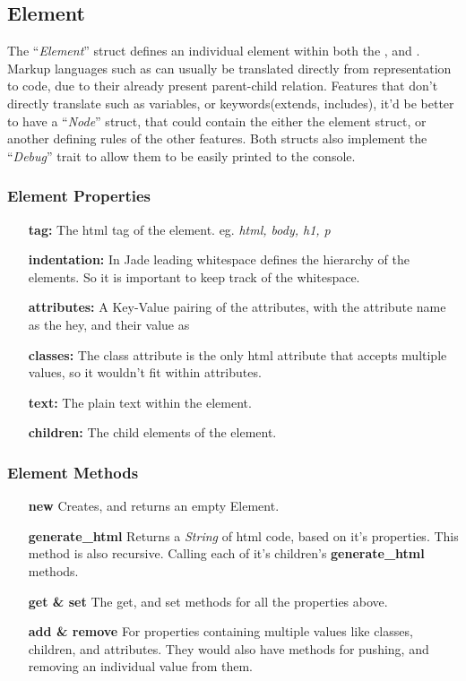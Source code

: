 \subsection{Element}
The ``\textit{Element}'' struct defines an individual element within both the , and . Markup languages such as  can usually be translated directly from  representation to code, due to their already present parent-child relation. Features that don't directly translate such as variables, or keywords(extends, includes), it'd be better to have a ``\textit{Node}'' struct, that could contain the either the element struct, or another defining rules of the other features. Both structs also implement the ``\textit{Debug}'' trait to allow them to be easily printed to the console.

\subsubsection{Element Properties}
\begin{itemize}
    \item[\textbf{tag:}] The html tag of the element. eg. \textit{html, body, h1, p}
    \item[\textbf{indentation:}] In Jade leading whitespace defines the hierarchy of the elements. So it is important to keep track of the whitespace.
    \item[\textbf{attributes:}] A Key-Value pairing of the attributes, with the attribute name as the hey, and their value as 
    \item[\textbf{classes:}] The class attribute is the only html attribute that accepts multiple values, so it wouldn't fit within attributes.
    \item[\textbf{text:}] The plain text within the element.
    \item[\textbf{children:}] The child elements of the element.
\end{itemize}

\subsubsection{Element Methods}
\begin{itemize}
    \item[\textbf{new}] Creates, and returns an empty Element.
    \item[\textbf{generate\_html}] Returns a \textit{String} of html code, based on it's properties. This method is also recursive. Calling each of it's children's \textbf{generate\_html} methods.
    \item[\textbf{get \& set}] The get, and set methods for all the properties above.
    \item[\textbf{add \& remove}] For properties containing multiple values like classes, children, and attributes. They would also have methods for pushing, and removing an individual value from them.
\end{itemize}

